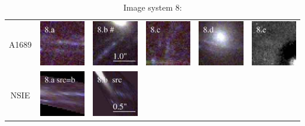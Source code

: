 \documentclass[useAMS,usenatbib]{mn2e}
\begin{document}
\begin{table}
  \caption{Image system 8:}\vspace{0mm}
  \begin{tabular}{cccccc}
    \multicolumn{1}{m{1cm}}{{\Large A1689}}
    & \multicolumn{1}{m{1.7cm}}{\includegraphics[height=2.00cm,clip]{figs/nsie_img/rgb.img_8_a.ps}}
    & \multicolumn{1}{m{1.7cm}}{\includegraphics[height=2.00cm,clip]{figs/nsie_img/rgb.img_8_b.ps}}
    & \multicolumn{1}{m{1.7cm}}{\includegraphics[height=2.00cm,clip]{figs/nsie_img/rgb.img_8_c.ps}}
    & \multicolumn{1}{m{1.7cm}}{\includegraphics[height=2.00cm,clip]{figs/nsie_img/rgb.img_8_d.ps}}
    & \multicolumn{1}{m{1.7cm}}{\includegraphics[height=2.00cm,clip]{figs/nsie_img/eF775outac_sub.img_8_e.ps}} \\
    \multicolumn{1}{m{1cm}}{{\Large NSIE}}
    & \multicolumn{1}{m{1.7cm}}{\includegraphics[height=2.00cm,clip]{figs/nsie_img/rgb.pre_8_a_b_tri.ps}}
    & \multicolumn{1}{m{1.7cm}}{\includegraphics[height=2.00cm,clip]{figs/nsie_img/rgb.src_8_b.ps}}

\end{tabular}
\end{table}
\end{document}
